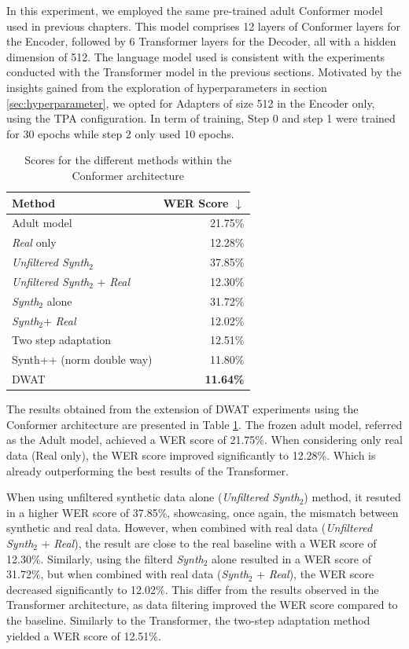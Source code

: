 In this experiment, we employed the same pre-trained adult Conformer model used in previous chapters. This model comprises 12 layers of Conformer layers for the Encoder, followed by 6 Transformer layers for the Decoder, all with a hidden dimension of 512. The language model used is consistent with the experiments conducted with the Transformer model in the previous sections. Motivated by the insights gained from the exploration of hyperparameters in section \ref{sec:hyperparameter}, we opted for Adapters of size 512 in the Encoder only, using the TPA configuration. In term of training, Step 0 and step 1 were trained for 30 epochs while step 2 only used 10 epochs. 

\begin{table}[h]
    \centering
    \begin{tabular}{lr}
        \toprule
        Method & \ac{WER} Score $\downarrow$ \\
        \midrule
        Adult model & 21.75\% \\
        \textit{Real} only & 12.28\% \\ \hline
        \textit{Unfiltered Synth$_2$} & 37.85\% \\
        \textit{Unfiltered Synth$_2$} + \textit{Real} & 12.30\% \\ 
        \textit{Synth$_2$} alone & 31.72\% \\
        \textit{Synth$_2$}+ \textit{Real} & 12.02\% \\ 
        Two step adaptation & 12.51\% \\ \hline
        Synth++ (norm double way) & 11.80\% \\
        DWAT & \textbf{11.64\%} \\
        \bottomrule
    \end{tabular}
    \caption{Scores for the different methods within the Conformer architecture}
    \label{tab:DWAT_conformer}
\end{table}

The results obtained from the extension of \ac{DWAT} experiments using the Conformer architecture are presented in Table \ref{tab:DWAT_conformer}. The frozen adult model, referred as the Adult model, achieved a \ac{WER} score of 21.75\%. When considering only real data (Real only), the \ac{WER} score improved significantly to 12.28\%. Which is already outperforming the best results of the Transformer.

When using unfiltered synthetic data alone (\textit{Unfiltered Synth$_2$}) method, it resuted in a higher \ac{WER} score of 37.85\%, showcasing, once again, the mismatch between synthetic and real data. However, when combined with real data (\textit{Unfiltered Synth$_2$} + \textit{Real}), the result are close to the real baseline with a \ac{WER} score of 12.30\%. Similarly, using the filterd \textit{Synth$_2$} alone resulted in a \ac{WER} score of 31.72\%, but when combined with real data (\textit{Synth$_2$} + \textit{Real}), the \ac{WER} score decreased significantly to 12.02\%. This differ from the results observed in the Transformer architecture, as data filtering improved the \ac{WER} score compared to the baseline.
Similarly to the Transformer, the two-step adaptation method yielded a \ac{WER} score of 12.51\%. 

